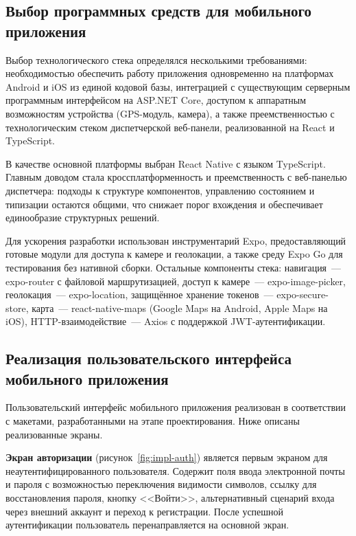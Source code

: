 \subsection{Выбор программных средств для мобильного приложения}

Выбор технологического стека определялся несколькими требованиями: необходимостью обеспечить работу приложения одновременно на платформах Android и iOS из единой кодовой базы, интеграцией с существующим серверным программным интерфейсом на ASP.NET Core, доступом к аппаратным возможностям устройства (GPS-модуль, камера), а также преемственностью с технологическим стеком диспетчерской веб-панели, реализованной на React и TypeScript.

В качестве основной платформы выбран React Native с языком TypeScript. Главным доводом стала кроссплатформенность и преемственность с веб-панелью диспетчера: подходы к структуре компонентов, управлению состоянием и типизации остаются общими, что снижает порог вхождения и обеспечивает единообразие структурных решений.

Для ускорения разработки использован инструментарий Expo, предоставляющий готовые модули для доступа к камере и геолокации, а также среду Expo Go для тестирования без нативной сборки. Остальные компоненты стека: навигация~--- expo-router с файловой маршрутизацией, доступ к камере~--- expo-image-picker, геолокация~--- expo-location, защищённое хранение токенов~--- expo-secure-store, карта~--- react-native-maps (Google Maps на Android, Apple Maps на iOS), HTTP-взаимодействие~--- Axios с поддержкой JWT-аутентификации.

\subsection{Реализация пользовательского интерфейса мобильного приложения}

Пользовательский интерфейс мобильного приложения реализован в соответствии с макетами, разработанными на этапе проектирования. Ниже описаны реализованные экраны.

\textbf{Экран авторизации} (рисунок~\ref{fig:impl-auth}) является первым экраном для неаутентифицированного пользователя. Содержит поля ввода электронной почты и пароля с возможностью переключения видимости символов, ссылку для восстановления пароля, кнопку <<Войти>>, альтернативный сценарий входа через внешний аккаунт и переход к регистрации. После успешной аутентификации пользователь перенаправляется на основной экран.

